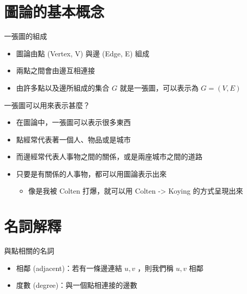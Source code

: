 \documentclass[aspectratio=169]{beamer}
\begin{document}
    \section{圖論的基本概念}

    \begin{frame}{一張圖的組成}
        \begin{itemize}
            \item<1-> 圖論由點 (Vertex, V) 與邊 (Edge, E) 組成
            \item<2-> 兩點之間會由邊互相連接
            \item<3-> 由許多點以及邊所組成的集合 $G$ 就是一張圖，可以表示為 $G = (V, E)$
        \end{itemize}
    \end{frame}

    \begin{frame}{一張圖可以用來表示甚麼？}
        \begin{itemize}
            \item<1-> 在圖論中，一張圖可以表示很多東西
            \item<2-> 點經常代表著一個人、物品或是城市
            \item<2-> 而邊經常代表人事物之間的關係，或是兩座城市之間的道路
            \item<3-> 只要是有關係的人事物，都可以用圖論表示出來
                \begin{itemize}
                    \item<4-> 像是我被 Colten 打爆，就可以用 Colten -> Koying 的方式呈現出來
                \end{itemize}
        \end{itemize}
    \end{frame}

    \section{名詞解釋}

    \begin{frame}{與點相關的名詞}
        \begin{itemize}
            \item<1-> 相鄰 (adjacent)：若有一條邊連結 $u, v$ ，則我們稱 $u, v$ 相鄰
            \item<2-> 度數 (degree)：與一個點相連接的邊數
        \end{itemize}
    \end{frame}
    
\end{document}
